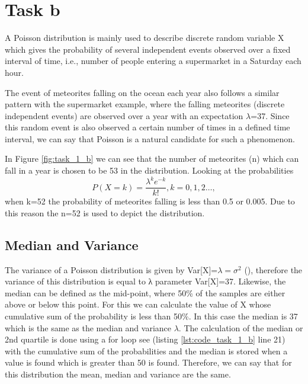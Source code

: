 \section{Task b}

A Poisson distribution is mainly used to describe discrete random variable X which gives the probability of several independent events observed over a fixed interval of time, i.e., number of people entering a supermarket in a Saturday each hour. \newline

The event of meteorites falling on the ocean each year also follows a similar pattern with the supermarket example, where the falling meteorites (discrete independent events) are observed over a year with an expectation ${\lambda}$=37. Since this random event is also observed a certain number of times in a defined time interval, we can say that Poisson is a natural candidate for such a phenomenon.\newline

In Figure \ref{fig:task_1_b} we can see that the number of meteorites (n) which can fall in a year is chosen to be 53 in the distribution. Looking at the probabilities  \begin{equation} P(X=k)=\frac{\lambda^k e^{-k}}{k!}, k=0,1,2…,  \label{pmf_poission}\end{equation} when k=52 the probability of meteorites falling is less than 0.5 or 0.005. Due to this reason the n=52 is used to depict the distribution. 

\subsection{Median and Variance}
The variance of a Poisson distribution is given by Var[X]=$\lambda=\sigma^2$ (\cite{hogg:2005}), therefore the variance of this distribution is equal to λ parameter Var[X]=37.
Likewise, the median can be defined as the mid-point, where 50\% of the samples are either above or below this point. For this we can calculate the value of X whose cumulative sum of the probability is less than 50\%. In this case the median is 37 which is the same as the median and variance $\lambda$. The calculation of the median or 2nd quartile is done using a for loop see (listing \ref{lst:code_task_1_b} line 21)  with the cumulative sum of the probabilities and the median is stored when a value is found which is greater than 50 is found. Therefore, we can say that for this distribution the mean, median and variance are the same.

